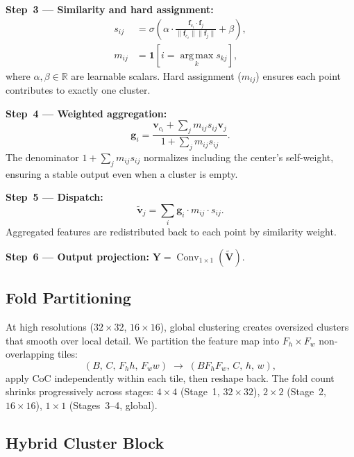 \documentclass[conference]{IEEEtran}
\begin{document}
\noindent\textbf{Step~3 --- Similarity and hard assignment:}
\begin{align}
  s_{ij}&=\sigma\!\left(\alpha\cdot
    \frac{\mathbf{f}_{c_i}\cdot\mathbf{f}_j}
         {\|\mathbf{f}_{c_i}\|\|\mathbf{f}_j\|}+\beta\right),
  \label{eq:sim}\\
  m_{ij}&=\mathbf{1}\!\left[i=\operatorname*{arg\,max}_{k}s_{kj}\right],
  \label{eq:mask}
\end{align}
where $\alpha,\beta\in\mathbb{R}$ are learnable scalars. Hard
assignment ($m_{ij}$) ensures each point contributes to exactly one
cluster.

\noindent\textbf{Step~4 --- Weighted aggregation:}
\begin{equation}
  \mathbf{g}_i=
  \frac{\mathbf{v}_{c_i}+\displaystyle\sum_j m_{ij}s_{ij}\mathbf{v}_j}
       {1+\displaystyle\sum_j m_{ij}s_{ij}}.
  \label{eq:aggregate}
\end{equation}
The denominator $1{+}\sum_j m_{ij}s_{ij}$ normalizes including the center's
self-weight, ensuring a stable output even when a cluster is empty.

\noindent\textbf{Step~5 --- Dispatch:}
\begin{equation}
  \tilde{\mathbf{v}}_j=\sum_i\mathbf{g}_i\cdot m_{ij}\cdot s_{ij}.
  \label{eq:dispatch}
\end{equation}
Aggregated features are redistributed back to each point by
similarity weight.

\noindent\textbf{Step~6 --- Output projection:}
$\mathbf{Y}=\operatorname{Conv}_{1\times1}(\tilde{\mathbf{V}})$.

\subsection{Fold Partitioning}

At high resolutions ($32\!\times\!32$, $16\!\times\!16$), global
clustering creates oversized clusters that smooth over local detail.
We partition the feature map into $F_h\!\times\!F_w$
non-overlapping tiles:
\begin{equation}
  (B,\,C,\,F_h h,\,F_w w)\;\longrightarrow\;(B F_h F_w,\,C,\,h,\,w),
  \label{eq:fold}
\end{equation}
apply CoC independently within each tile, then reshape back. The
fold count shrinks progressively across stages:
$4\!\times\!4$ (Stage~1, $32\!\times\!32$),
$2\!\times\!2$ (Stage~2, $16\!\times\!16$),
$1\!\times\!1$ (Stages~3--4, global).

\subsection{Hybrid Cluster Block}
\label{ssec:hybrid}
\end{document}
